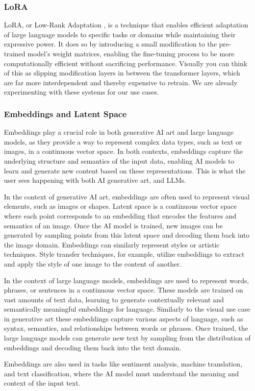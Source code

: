 \subsubsection{LoRA}
LoRA, or Low-Rank Adaptation \cite{hu2021lora}, is a technique that enables efficient adaptation of large language models to specific tasks or domains while maintaining their expressive power. It does so by introducing a small modification to the pre-trained model's weight matrices, enabling the fine-tuning process to be more computationally efficient without sacrificing performance. Visually you can think of this as slipping modification layers in between the transformer layers, which are far more interdependent and thereby expensive to retrain. We are already experimenting with these systems for our use cases.
\subsubsection{Embeddings and Latent Space}
Embeddings play a crucial role in both generative AI art and large language models, as they provide a way to represent complex data types, such as text or images, in a continuous vector space. In both contexts, embeddings capture the underlying structure and semantics of the input data, enabling AI models to learn and generate new content based on these representations. This is what the user sees happening with both AI generative art, and LLMs.\par 
In the context of generative AI art, embeddings are often used to represent visual elements, such as images or shapes. Latent space is a continuous vector space where each point corresponds to an embedding that encodes the features and semantics of an image. Once the AI model is trained, new images can be generated by sampling points from this latent space and decoding them back into the image domain. Embeddings can similarly represent styles or artistic techniques. Style transfer techniques, for example, utilize embeddings to extract and apply the style of one image to the content of another.\par 
In the context of large language models, embeddings are used to represent words, phrases, or sentences in a continuous vector space. These models are trained on vast amounts of text data, learning to generate contextually relevant and semantically meaningful embeddings for language. Similarly to the visual use case in generative art these embeddings capture various aspects of language, such as syntax, semantics, and relationships between words or phrases. Once trained, the large language models can generate new text by sampling from the distribution of embeddings and decoding them back into the text domain.\par 
Embeddings are also used in tasks like sentiment analysis, machine translation, and text classification, where the AI model must understand the meaning and context of the input text.
